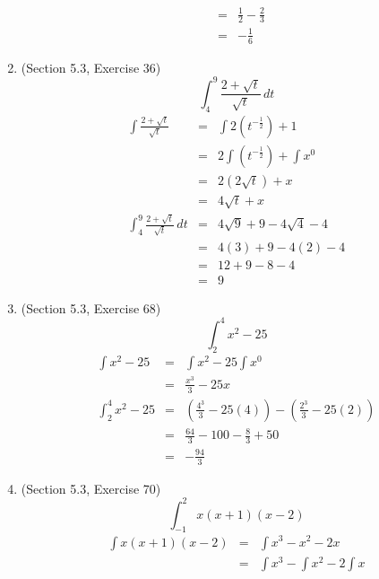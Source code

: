 \documentclass{article}
\begin{document}
\begin{enumerate}
\begin{eqnarray}
                                                    &=& \frac{1}{2} - \frac{2}{3} \\
                                                    &=& -\frac{1}{6}
        \end{eqnarray}
    \item (Section 5.3, Exercise 36)
        $$\int_4^9{\frac{2 + \sqrt{t}}{\sqrt{t}}\,dt}$$
        \begin{eqnarray}
            \int{\frac{2 + \sqrt{t}}{\sqrt{t}}} &=& \int{2\left(t^{-\frac{1}{2}}\right) + 1} \\
                                                &=& 2\int{\left(t^{-\frac{1}{2}}\right)} + \int{x^0} \\
                                                &=& 2\left(2\sqrt{t}\right) + x \\
                                                &=& 4\sqrt{t} + x \\
            \int_4^9{\frac{2 + \sqrt{t}}{\sqrt{t}}\,dt} &=& 4\sqrt{9} + 9 - 4\sqrt{4} - 4 \\
                                                        &=& 4(3) + 9 - 4(2) - 4 \\
                                                        &=& 12 + 9 - 8 - 4 \\
                                                        &=& 9
        \end{eqnarray}
    \item (Section 5.3, Exercise 68)
        $$\int_2^4{x^2 - 25}$$
        \begin{eqnarray}
            \int{x^2 - 25} &=& \int{x^2} - 25\int{x^0} \\
                           &=& \frac{x^3}{3} - 25x \\
            \int_2^4{x^2 - 25} &=& \left(\frac{4^3}{3} - 25(4)\right) - \left(\frac{2^3}{3} - 25(2)\right) \\
                               &=& \frac{64}{3} - 100 - \frac{8}{3} + 50 \\
                               &=& -\frac{94}{3}
        \end{eqnarray}
    \item (Section 5.3, Exercise 70)
        $$\int_{-1}^2{x\left(x + 1\right)\left(x - 2\right)}$$
        \begin{eqnarray}
            \int{x\left(x + 1\right)\left(x - 2\right)} &=& \int{x^3 - x^2 - 2x} \\
                                                        &=& \int{x^3} - \int{x^2} - 2\int{x} \\

\end{eqnarray}
\end{enumerate}
\end{document}
